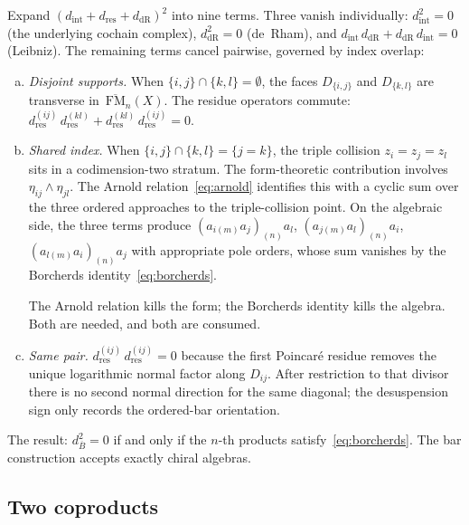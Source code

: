 \documentclass[11pt,reqno]{amsart}
\theoremstyle{definition}
\theoremstyle{remark}
\newcommand{\barB}{\overline{B}}
\newcommand{\FM}{\overline{\mathrm{FM}}}
\numberwithin{equation}{section}
\begin{document}
Expand $(d_{\mathrm{int}} + d_{\mathrm{res}}
+ d_{\mathrm{dR}})^2$ into nine terms. Three vanish
individually: $d_{\mathrm{int}}^2 = 0$ (the underlying cochain
complex), $d_{\mathrm{dR}}^2 = 0$ (de~Rham), and
$d_{\mathrm{int}}\,d_{\mathrm{dR}}
+ d_{\mathrm{dR}}\,d_{\mathrm{int}} = 0$ (Leibniz). The
remaining terms cancel pairwise, governed by index overlap:

\begin{enumerate}[(a)]
\item \emph{Disjoint supports.}
When $\{i,j\} \cap \{k,l\} = \emptyset$, the faces
$D_{\{i,j\}}$ and $D_{\{k,l\}}$ are transverse
in~$\FM_n(X)$. The residue operators commute:
$d_{\mathrm{res}}^{(ij)}\,d_{\mathrm{res}}^{(kl)}
+ d_{\mathrm{res}}^{(kl)}\,d_{\mathrm{res}}^{(ij)} = 0$.

\item \emph{Shared index.}
When $\{i,j\} \cap \{k,l\} = \{j = k\}$, the triple
collision $z_i = z_j = z_l$ sits in a codimension-two
stratum. The form-theoretic contribution involves
$\eta_{ij} \wedge \eta_{jl}$. The Arnold
relation~\eqref{eq:arnold} identifies this with a cyclic
sum over the three ordered approaches to the triple-collision
point. On the algebraic side, the three terms produce
$(a_{i(m)}a_j)_{(n)}a_l$,
$(a_{j(m)}a_l)_{(n)}a_i$,
$(a_{l(m)}a_i)_{(n)}a_j$
with appropriate pole orders, whose sum vanishes by the
Borcherds identity~\eqref{eq:borcherds}.

The Arnold relation kills the form; the Borcherds identity
kills the algebra. Both are needed, and both are consumed.

\item \emph{Same pair.}
$d_{\mathrm{res}}^{(ij)}\,d_{\mathrm{res}}^{(ij)} = 0$
because the first Poincar\'e residue removes the unique logarithmic
normal factor along \(D_{ij}\).  After restriction to that divisor there
is no second normal direction for the same diagonal; the desuspension
sign only records the ordered-bar orientation.
\end{enumerate}

The result: $d_{\barB}^2 = 0$ if and only if the
$n$-th products satisfy~\eqref{eq:borcherds}. The bar
construction accepts exactly chiral algebras.


\subsection{Two coproducts}
\label{ssec:coproducts}
\end{document}
